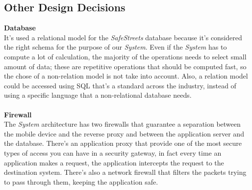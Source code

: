 \documentclass{article}
\begin{document}
	\subsection{Other Design Decisions}
	{\bf Database} \\
	It's used a relational model for the {\it SafeStreets} database because it's considered the  right schema for the purpose of our {\it System}. Even if the {\it System} has to compute a lot of calculation, the majority of the operations needs to select small amount of data; these are repetitive operations that should be computed fast, so the chose of a non-relation model is not take into account. Also, a relation model could be accessed using SQL that's a standard across the industry, instead of using a specific language that a non-relational database needs.
	\\ \\ 
	{\bf Firewall} \\ 
	The {\it System} architecture has two firewalls that guarantee a separation between the mobile device and the reverse proxy and between the application server and the database. There's an application proxy that provide one of the most secure types of access you can have in a security gateway, in fact every time an application makes a request, the application intercepts the request to the destination system. There's also a network firewall that filters the packets trying to pass through them, keeping the application safe.
	\\ \\
	
\pagebreak

\end{document}
